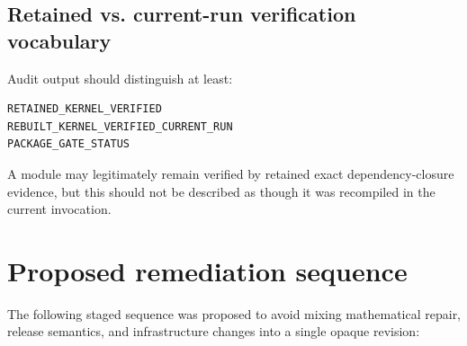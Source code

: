 \documentclass[11pt,a4paper]{article}
\begin{document}
\subsection{Retained vs. current-run verification vocabulary}

Audit output should distinguish at least:

\begin{lstlisting}
RETAINED_KERNEL_VERIFIED
REBUILT_KERNEL_VERIFIED_CURRENT_RUN
PACKAGE_GATE_STATUS
\end{lstlisting}

A module may legitimately remain verified by retained exact dependency-closure evidence, but this should not be described as though it was recompiled in the current invocation.

\section{Proposed remediation sequence}

The following staged sequence was proposed to avoid mixing mathematical repair, release semantics, and infrastructure changes into a single opaque revision:
\end{document}

